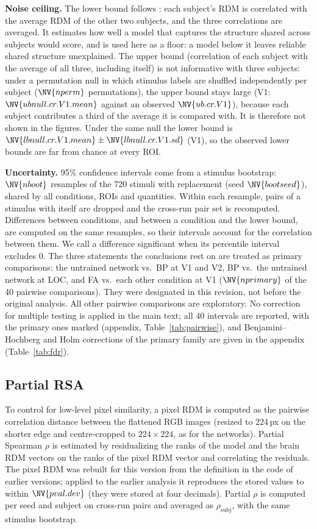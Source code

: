 \documentclass[10pt,twocolumn]{article}
\begin{document}
\textbf{Noise ceiling.} The lower bound follows \citet{nili2014}: each subject's RDM is correlated with the average RDM of the other two subjects, and the three correlations are averaged. It estimates how well a model that captures the structure shared across subjects would score, and is used here as a floor: a model below it leaves reliable shared structure unexplained. The upper bound (correlation of each subject with the average of all three, including itself) is not informative with three subjects: under a permutation null in which stimulus labels are shuffled independently per subject ($\NV{nperm}$ permutations), the upper bound stays large (V1: $\NV{ubnull.cr.V1.mean}$ against an observed $\NV{ub.cr.V1}$), because each subject contributes a third of the average it is compared with. It is therefore not shown in the figures. Under the same null the lower bound is $\NV{lbnull.cr.V1.mean} \pm \NV{lbnull.cr.V1.sd}$ (V1), so the observed lower bounds are far from chance at every ROI.

\textbf{Uncertainty.} 95\% confidence intervals come from a stimulus bootstrap: $\NV{nboot}$ resamples of the 720 stimuli with replacement (seed $\NV{bootseed}$), shared by all conditions, ROIs and quantities. Within each resample, pairs of a stimulus with itself are dropped and the cross-run pair set is recomputed. Differences between conditions, and between a condition and the lower bound, are computed on the same resamples, so their intervals account for the correlation between them. We call a difference significant when its percentile interval excludes 0. The three statements the conclusions rest on are treated as primary comparisons: the untrained network vs.\ BP at V1 and V2, BP vs.\ the untrained network at LOC, and FA vs.\ each other condition at V1 ($\NV{nprimary}$ of the 40 pairwise comparisons). They were designated in this revision, not before the original analysis. All other pairwise comparisons are exploratory. No correction for multiple testing is applied in the main text; all 40 intervals are reported, with the primary ones marked (appendix, Table~\ref{tab:pairwise}), and Benjamini--Hochberg and Holm corrections of the primary family are given in the appendix (Table~\ref{tab:fdr}).

\subsection{Partial RSA}

To control for low-level pixel similarity, a pixel RDM is computed as the pairwise correlation distance between the flattened RGB images (resized to $224$\,px on the shorter edge and centre-cropped to $224\times224$, as for the networks). Partial Spearman $\rho$ is estimated by residualizing the ranks of the model and the brain RDM vectors on the ranks of the pixel RDM vector and correlating the residuals. The pixel RDM was rebuilt for this version from the definition in the code of earlier versions; applied to the earlier analysis it reproduces the stored values to within $\NV{pval.dev}$ (they were stored at four decimals). Partial $\rho$ is computed per seed and subject on cross-run pairs and averaged as $\rho_{\text{subj}}$, with the same stimulus bootstrap.
\end{document}
